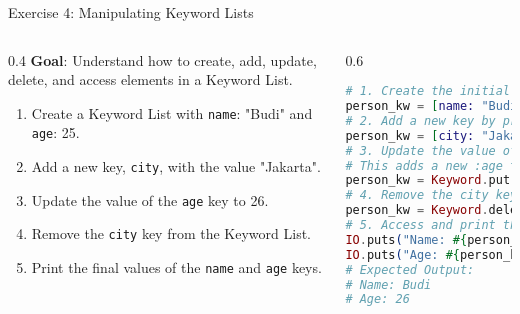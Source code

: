 \documentclass[aspectratio=169, table]{beamer}
\begin{document}
\begin{frame}[fragile]{Exercise 4: Manipulating Keyword Lists}
\vspace{15pt}
\begin{columns}
    \begin{column}[T]{0.4\textwidth}
        \textbf{Goal}: Understand how to create, add, update, delete, and access elements in a Keyword List.

        \begin{enumerate}
            \item Create a Keyword List with \texttt{name}: "Budi" and \texttt{age}: 25.
            \item Add a new key, \texttt{city}, with the value "Jakarta".
            \item Update the value of the \texttt{age} key to 26.
            \item Remove the \texttt{city} key from the Keyword List.
            \item Print the final values of the \texttt{name} and \texttt{age} keys.
        \end{enumerate}

    \end{column}

    \begin{column}[T]{0.6\textwidth}
        \begin{lstlisting}[language=Elixir, basicstyle=\ttfamily\footnotesize]
# 1. Create the initial Keyword List
person_kw = [name: "Budi", age: 25]
# 2. Add a new key by prepending
person_kw = [city: "Jakarta" | person_kw]
# 3. Update the value of the age key
# This adds a new :age tuple at the front
person_kw = Keyword.put(person_kw, :age, 26)
# 4. Remove the city key
person_kw = Keyword.delete(person_kw, :city)
# 5. Access and print the values
IO.puts("Name: #{person_kw[:name]}")
IO.puts("Age: #{person_kw[:age]}")
# Expected Output:
# Name: Budi
# Age: 26
        \end{lstlisting}
    \end{column}
\end{columns}
\end{frame}
\end{document}
